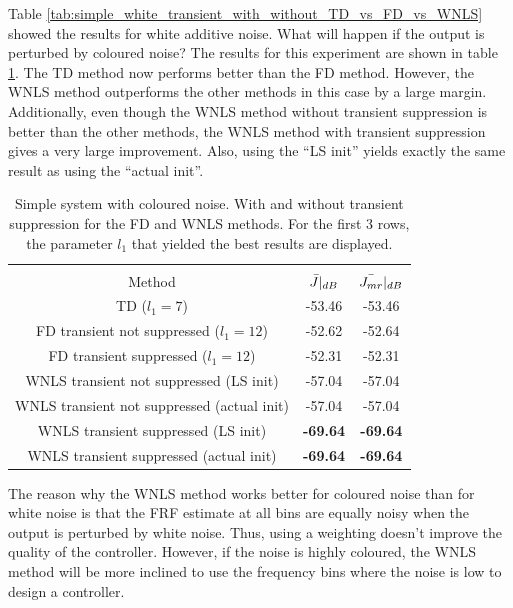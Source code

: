 Table \ref{tab:simple_white_transient_with_without_TD_vs_FD_vs_WNLS} showed the results for white additive noise. What will happen if the output is perturbed by coloured noise?  The results for this experiment are shown in table \ref{tab:simple_coloured_transient_with_without_TD_vs_FD_vs_WNLS}. The TD method now performs better than the FD method. However, the WNLS method outperforms the other methods in this case by a large margin. Additionally, even though the WNLS method without transient suppression is better than the other methods, the WNLS method with transient suppression gives a very large improvement. Also, using the ``LS init'' yields exactly the same result as using the ``actual init''.

\begin{table}[H]
\centering
\begin{tabular}{|ccc|}
\hline
&&\\[-2.5ex]
Method & $\Bar{J}|_{dB}$ & $\Bar{J_{mr}}|_{dB}$ \\
\hline
TD ($l_1 = 7$) & -53.46 & -53.46 \\
FD transient not suppressed ($l_1 = 12$) & -52.62 & -52.64 \\
FD transient suppressed ($l_1 = 12$) & -52.31 & -52.31 \\
WNLS transient not suppressed (LS init) & -57.04 & -57.04 \\
WNLS transient not suppressed (actual init) & -57.04 & -57.04 \\
WNLS transient suppressed (LS init) & \textbf{-69.64} & \textbf{-69.64} \\
WNLS transient suppressed (actual init) & \textbf{-69.64} & \textbf{-69.64} \\
\hline
\end{tabular}
\caption{Simple system with coloured noise. With and without transient suppression for the FD and WNLS methods. For the first 3 rows, the parameter $l_1$ that yielded the best results are displayed.}
\label{tab:simple_coloured_transient_with_without_TD_vs_FD_vs_WNLS}
\end{table}

The reason why the WNLS method works better for coloured noise than for white noise is that the FRF estimate at all bins are equally noisy when the output is perturbed by white noise. Thus, using a weighting doesn't improve the quality of the controller. However, if the noise is highly coloured, the WNLS method will be more inclined to use the frequency bins where the noise is low to design a controller.

